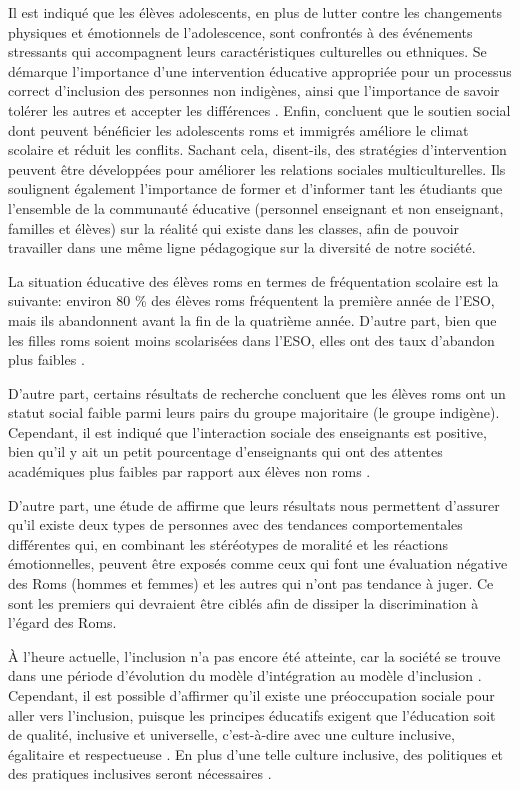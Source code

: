 \documentclass[french]{textolivre}
\begin{document}
Il est indiqué que les élèves adolescents, en plus de lutter contre les changements physiques et émotionnels de l'adolescence, sont confrontés à des événements stressants qui accompagnent leurs caractéristiques culturelles ou ethniques. Se démarque l'importance d'une intervention éducative appropriée pour un processus correct d'inclusion des personnes non indigènes, ainsi que l'importance de savoir tolérer les autres et accepter les différences \cite{graham_peer_2006}. Enfin, \textcite{hombrados-mendieta_apoyo_2013} concluent que le soutien social dont peuvent bénéficier les adolescents roms et immigrés améliore le climat scolaire et réduit les conflits. Sachant cela, disent-ils, des stratégies d'intervention peuvent être développées pour améliorer les relations sociales multiculturelles. Ils soulignent également l'importance de former et d'informer tant les étudiants que l'ensemble de la communauté éducative (personnel enseignant et non enseignant, familles et élèves) sur la réalité qui existe dans les classes, afin de pouvoir travailler dans une même ligne pédagogique sur la diversité de notre société.

La situation éducative des élèves roms en termes de fréquentation scolaire est la suivante: environ 80 \% des élèves roms fréquentent la première année de l'ESO, mais ils abandonnent avant la fin de la quatrième année. D'autre part, bien que les filles roms soient moins scolarisées dans l'ESO, elles ont des taux d'abandon plus faibles \cite{andres_imagenes_2006}.

D'autre part, certains résultats de recherche concluent que les élèves roms ont un statut social faible parmi leurs pairs du groupe majoritaire (le groupe indigène). Cependant, il est indiqué que l'interaction sociale des enseignants est positive, bien qu'il y ait un petit pourcentage d'enseignants qui ont des attentes académiques plus faibles par rapport aux élèves non roms \cite{leon_atencion_2008}.

D'autre part, une étude de \textcite{battro_neuroeducacion:_2012} affirme que leurs résultats nous permettent d'assurer qu'il existe deux types de personnes avec des tendances comportementales différentes qui, en combinant les stéréotypes de moralité et les réactions émotionnelles, peuvent être exposés comme ceux qui font une évaluation négative des Roms (hommes et femmes) et les autres qui n'ont pas tendance à juger. Ce sont les premiers qui devraient être ciblés afin de dissiper la discrimination à l'égard des Roms.

À l'heure actuelle, l'inclusion n'a pas encore été atteinte, car la société se trouve dans une période d'évolution du modèle d'intégration au modèle d'inclusion \cite{higueras_active_2020}. Cependant, il est possible d'affirmer qu'il existe une préoccupation sociale pour aller vers l'inclusion, puisque les principes éducatifs exigent que l'éducation soit de qualité, inclusive et universelle, c'est-à-dire avec une culture inclusive, égalitaire et respectueuse \cite{florian_enhancing_2020}. En plus d'une telle culture inclusive, des politiques et des pratiques inclusives seront nécessaires \cite{tzuc_salinas_inclusion_2022}.
\end{document}
